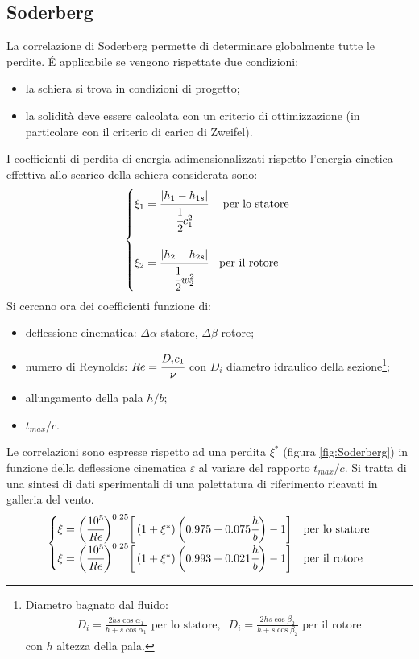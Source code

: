\subsection{Soderberg}
La correlazione di Soderberg permette di determinare globalmente tutte le perdite. \'E applicabile se vengono rispettate due condizioni:
\begin{itemize}
	\item la schiera si trova in condizioni di progetto;
	\item la solidità deve essere calcolata con un criterio di ottimizzazione (in particolare con il criterio di carico di Zweifel).
\end{itemize}
I coefficienti di perdita di energia adimensionalizzati rispetto l'energia cinetica effettiva allo scarico della schiera considerata sono:
\begin{align*}
\begin{cases}
\xi_1 = \cfrac{|h_1 - h_{1s}|}{\cfrac{1}{2} c_1^2} & \mbox{ per lo statore }\\
\\
\xi_2 = \cfrac{|h_2 - h_{2s}|}{\cfrac{1}{2} w_2^2} & \mbox{per il rotore }
\end{cases}
\end{align*}
Si cercano ora dei coefficienti funzione di:
\begin{itemize}
\item deflessione cinematica: $\Delta \alpha$ statore, $\Delta \beta$ rotore;
\item numero di Reynolds: $Re = \cfrac{D_i c_1 }{\nu}$
con $D_i$ diametro idraulico della sezione\footnote{ Diametro bagnato dal fluido: \begin{align*}
D_{i} = \frac{2 h s \cos \alpha_1}{h + s \cos \alpha_1} \mbox{ per lo statore}, \;\; D_{i} = \frac{2 h s \cos \beta_2}{h + s \cos \beta_2} \mbox{ per il rotore}
\end{align*} con $h$ altezza della pala.};
\item allungamento della pala $h/b$;
\item $t_{max}/c$.
\end{itemize}
Le correlazioni sono espresse rispetto ad una perdita $\xi^*$ (figura \ref{fig:Soderberg}) in funzione della deflessione cinematica $\varepsilon$ al variare del rapporto $t_{max}/c$. Si tratta di una sintesi di dati sperimentali di una palettatura di riferimento ricavati in galleria del vento.
\begin{align*}
\begin{cases}
\xi = \bigg( \cfrac{10^5}{Re} \bigg)^{0.25} \bigg[ \left( 1 + \xi^* \right) \bigg ( 0.975 + 0.075 \cfrac{h}{b} \bigg) -1 \bigg] & \mbox{per lo statore} \\
\xi = \bigg( \cfrac{10^5}{Re} \bigg)^{0.25} \bigg[ \left( 1 + \xi^* \right) \bigg ( 0.993 + 0.021 \cfrac{h}{b} \bigg) -1 \bigg] & \mbox{per il rotore}
\end{cases}
\end{align*}
